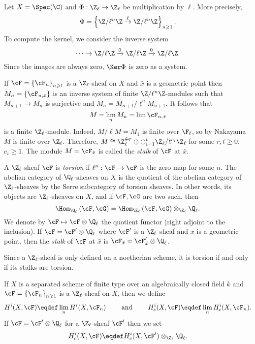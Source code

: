 \begin{example}
Let $X=\Spec(\C)$ and $\Phi : \Z_\ell\to \Z_\ell$ be multiplication by $\ell$. More precisely,
$$
\Phi = \left\{ \Z/\ell^n\Z \xrightarrow{\ell} \Z/\ell^n\Z\right\}_{n \geqslant 1}.
$$ 
To compute the kernel, we consider the inverse system 
$$
\cdots\to \Z/\ell\Z\xrightarrow{0} \Z/\ell\Z\xrightarrow{0}\Z/\ell\Z.
$$
Since the images are always zero, $\Ker \Phi$ is zero as a system. 
\end{example}

\begin{remark} 
If $\cF = \left\{\cF_n\right\}_{n\geqslant 1}$ is a $\Z_\ell$-sheaf on $X$ and $\bar x$ is a geometric point then $M_n=\left\{\cF_{n, \bar x}\right\}$ is an inverse system of finite $\Z/\ell^n\Z$-modules such that $M_{n+1}\to M_n$ is surjective and $M_n=M_{n+1}/\ell^n M_{n+1}$. It follows that
$$
M= \lim_n M_n = \lim \cF_{n, \bar x}
$$
is a finite $\Z_\ell$-module. Indeed, $M/\ell M= M_1$ is finite over $\F_\ell$, so by Nakayama $M$ is finite over $\Z_\ell$. Therefore, $M\cong \Z_\ell^{\oplus r} \oplus \oplus_{i=1}^t \Z_\ell/\ell^{e_i}\Z_\ell$ for some $r, t\geqslant 0$, $e_i\geqslant 1$. The module $M = \cF_{\bar x}$ is called the \emph{stalk} of $\cF$ at $\bar x$.
\end{remark}

\begin{defi} 
A $\Z_\ell$-sheaf $\cF$ is \emph{torsion} if $\ell^n: \cF \to \cF$ is the zero map for some $n$. The abelian category of $\Q_\ell$-sheaves on $X$ is the quotient of the abelian category of $\Z_\ell$-sheaves by the Serre subcategory of torsion sheaves.  In other words, its objects are $\Z_\ell$-sheaves on $X$, and if $\cF, \cG$ are two such, then
$$
\Hom_{\Q_\ell} \left(\cF, \cG \right) = \Hom_{\Z_\ell} \left(\cF, \cG\right) \otimes_{\Z_\ell} \Q_\ell.
$$
We denote by $\cF \mapsto \cF \otimes \Q_\ell$ the quotient functor (right adjoint to the inclusion). If $\cF = \cF' \otimes \Q_\ell$ where $\cF'$ is a $\Z_\ell$-sheaf and $\bar x$ is a geometric point, then the \emph{stalk} of $\cF$ at $\bar x$ is $\cF_{\bar x} = \cF'_{\bar x} \otimes \Q_\ell$.
\end{defi}

\begin{remark}
Since a $\Z_\ell$-sheaf is only defined on a noetherian scheme, it is torsion if and only if its stalks are torsion. 
\end{remark}

\begin{defi} 
If $X$ is a separated scheme of finite type over an algebraically closed field $k$ and $\cF = \left\{\cF_n\right\}_{n\geqslant 1}$ is a $\Z_\ell$-sheaf on $X$, then we define
$$
H^i(X, \cF) \eqdef \lim_n H^i(X, \cF_n)
\qquad\text{ and }\qquad
H_c^i(X, \cF) \eqdef \lim_n H_c^i(X, \cF_n).
$$
If $\cF = \cF'\otimes \Q_\ell$ for a $\Z_\ell$-sheaf  $\cF'$ then we set
$$
H_c^i(X ,\cF) \eqdef H_c^i(X, \cF')\otimes_{\Z_\ell}\Q_\ell.
$$
\end{defi}

